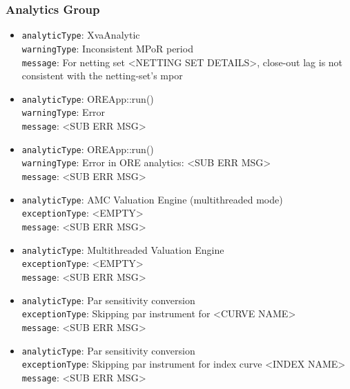 \subsubsection*{Analytics Group}
\begin{itemize}


  \item \lstinline!analyticType!: XvaAnalytic \\
        \lstinline!warningType!: Inconsistent MPoR period \\
        \lstinline!message!: For netting set <NETTING SET DETAILS>, close-out lag is not consistent with the netting-set's mpor

  \item \lstinline!analyticType!: OREApp::run() \\
        \lstinline!warningType!: Error \\
        \lstinline!message!: <SUB ERR MSG>

  \item \lstinline!analyticType!: OREApp::run() \\
        \lstinline!warningType!: Error in ORE analytics: <SUB ERR MSG> \\
        \lstinline!message!: <SUB ERR MSG>

  \item \lstinline!analyticType!: AMC Valuation Engine (multithreaded mode) \\
        \lstinline!exceptionType!: <EMPTY> \\
        \lstinline!message!: <SUB ERR MSG>

  \item \lstinline!analyticType!: Multithreaded Valuation Engine \\
        \lstinline!exceptionType!: <EMPTY> \\
        \lstinline!message!: <SUB ERR MSG>

  \item \lstinline!analyticType!: Par sensitivity conversion \\
        \lstinline!exceptionType!: Skipping par instrument for <CURVE NAME> \\
        \lstinline!message!: <SUB ERR MSG>

  \item \lstinline!analyticType!: Par sensitivity conversion \\
        \lstinline!exceptionType!: Skipping par instrument for index curve <INDEX NAME> \\
        \lstinline!message!: <SUB ERR MSG>


\end{itemize}
